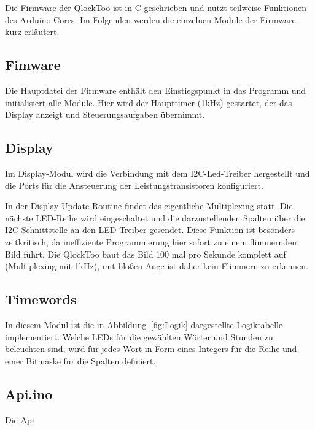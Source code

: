 \begin{multicols}{2}
Die Firmware der QlockToo ist in C geschrieben und nutzt teilweise Funktionen des Arduino-Cores.
Im Folgenden werden die einzelnen Module der Firmware kurz erläutert.

\subsection{Fimware}
Die Hauptdatei der Firmware enthält den Einstiegspunkt in das Programm und initialisiert alle Module. Hier wird der Haupttimer (1kHz) gestartet, der das Display anzeigt und Steuerungsaufgaben übernimmt.

\subsection{Display}
Im Display-Modul wird die Verbindung mit dem I2C-Led-Treiber hergestellt und die Ports für die Ansteuerung der Leistungstransistoren konfiguriert.

In der Display-Update-Routine findet das eigentliche Multiplexing statt. Die nächste LED-Reihe wird eingeschaltet und die darzustellenden Spalten über die I2C-Schnittstelle an den LED-Treiber gesendet.
Diese Funktion ist besonders zeitkritisch, da ineffiziente Programmierung hier sofort zu einem flimmernden Bild führt.
Die QlockToo baut das Bild 100 mal pro Sekunde komplett auf (Multiplexing mit 1kHz), mit bloßen Auge ist daher kein Flimmern zu erkennen.

\subsection{Timewords}
In diesem Modul ist die in Abbildung~\ref{fig:Logik} dargestellte Logiktabelle implementiert.
Welche LEDs für die gewählten Wörter und Stunden zu beleuchten sind, wird für jedes Wort in Form eines Integers für die Reihe und einer Bitmaske für die Spalten definiert.

\subsection{}

\subsection{Api.ino}
Die Api
\end{multicols}
